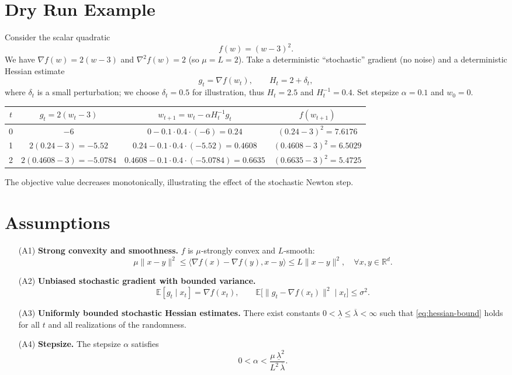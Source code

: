 \documentclass{article}
\newcommand{\E}{\mathbb{E}}
\newcommand{\R}{\mathbb{R}}
\begin{document}
\section*{Dry Run Example}
Consider the scalar quadratic
\[
f(w)=(w-3)^{2}.
\]
We have $\nabla f(w)=2(w-3)$ and $\nabla^{2}f(w)=2$ (so $\mu=L=2$).  
Take a deterministic “stochastic” gradient (no noise) and a deterministic Hessian estimate
\[
g_{t}= \nabla f(w_{t}),\qquad H_{t}=2+\delta_{t},
\]
where $\delta_{t}$ is a small perturbation; we choose $\delta_{t}=0.5$ for illustration, thus
$H_{t}=2.5$ and $H_{t}^{-1}=0.4$.
Set stepsize $\alpha=0.1$ and $w_{0}=0$.

\begin{center}
\begin{tabular}{c|c|c|c}
$t$ & $g_{t}=2(w_{t}-3)$ & $w_{t+1}=w_{t}-\alpha H_{t}^{-1}g_{t}$ & $f(w_{t+1})$\\\hline
0 & $-6$ & $0-0.1\cdot0.4\cdot(-6)=0.24$ & $(0.24-3)^{2}=7.6176$\\
1 & $2(0.24-3)=-5.52$ & $0.24-0.1\cdot0.4\cdot(-5.52)=0.4608$ & $(0.4608-3)^{2}=6.5029$\\
2 & $2(0.4608-3)=-5.0784$ & $0.4608-0.1\cdot0.4\cdot(-5.0784)=0.6635$ & $(0.6635-3)^{2}=5.4725$\\
\end{tabular}
\end{center}
The objective value decreases monotonically, illustrating the effect of the stochastic Newton step.

\newpage
\section*{Assumptions}
\begin{enumerate}
\item[(A1)] \textbf{Strong convexity and smoothness.} $f$ is $\mu$‑strongly convex and $L$‑smooth:
\[
\mu\|x-y\|^{2} \le \langle \nabla f(x)-\nabla f(y),x-y\rangle \le L\|x-y\|^{2},
\quad\forall x,y\in\R^{d}.
\]

\item[(A2)] \textbf{Unbiased stochastic gradient with bounded variance.}
\[
\E[g_{t}\mid x_{t}]=\nabla f(x_{t}),\qquad 
\E\big[\|g_{t}-\nabla f(x_{t})\|^{2}\mid x_{t}\big]\le\sigma^{2}.
\]

\item[(A3)] \textbf{Uniformly bounded stochastic Hessian estimates.}
There exist constants $0<\underline{\lambda}\le \overline{\lambda}<\infty$ such that
\eqref{eq:hessian-bound} holds for all $t$ and all realizations of the randomness.

\item[(A4)] \textbf{Stepsize.} The stepsize $\alpha$ satisfies
\[
0<\alpha<\frac{\mu\,\underline{\lambda}^{2}}{L^{2}\,\overline{\lambda}}.
\]
\end{enumerate}
\end{document}
